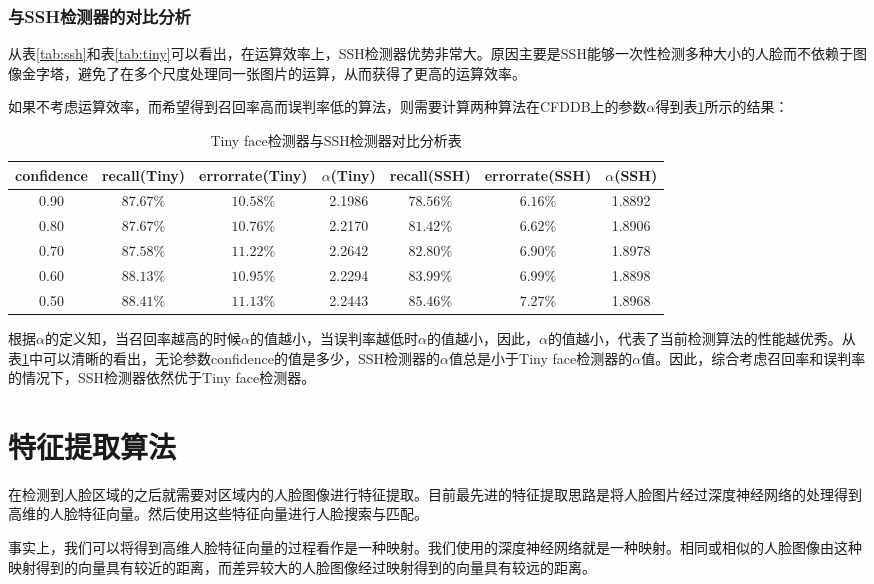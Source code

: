 \subsubsection{与SSH检测器的对比分析}

从表\ref{tab:ssh}和表\ref{tab:tiny}可以看出，在运算效率上，SSH检测器优势非常大。原因主要是SSH能够一次性检测多种大小的人脸而不依赖于图像金字塔，避免了在多个尺度处理同一张图片的运算，从而获得了更高的运算效率。

如果不考虑运算效率，而希望得到召回率高而误判率低的算法，则需要计算两种算法在CFDDB上的参数$\alpha$得到表\ref{tab:tinyandssh}所示的结果：

\begin{table}[!hpb]
	\centering
	\caption{Tiny face检测器与SSH检测器对比分析表}
	\label{tab:tinyandssh}
	\begin{tabular}{ c|ccc|ccc }
		\hline
		confidence & recall(Tiny) & errorrate(Tiny) &$\alpha$(Tiny) & recall(SSH)& errorrate(SSH)& $\alpha$(SSH)\\
		\hline
		0.90  & $87.67\%$& $10.58\%$& 2.1986 & $78.56\%$& $6.16\%$& 1.8892\\
		0.80  & $87.67\%$& $10.76\%$& 2.2170 & $81.42\%$& $6.62\%$& 1.8906\\
		0.70  & $87.58\%$& $11.22\%$& 2.2642 & $82.80\%$& $6.90\%$& 1.8978\\
		0.60  & $88.13\%$& $10.95\%$& 2.2294 & $83.99\%$& $6.99\%$& 1.8898\\
		0.50  & $88.41\%$& $11.13\%$& 2.2443 & $85.46\%$& $7.27\%$& 1.8968\\
		\hline
	\end{tabular}
\end{table}

根据$\alpha$的定义知，当召回率越高的时候$\alpha$的值越小，当误判率越低时$\alpha$的值越小，因此，$\alpha$的值越小，代表了当前检测算法的性能越优秀。从表\ref{tab:tinyandssh}中可以清晰的看出，无论参数confidence的值是多少，SSH检测器的$\alpha$值总是小于Tiny face检测器的$\alpha$值。因此，综合考虑召回率和误判率的情况下，SSH检测器依然优于Tiny face检测器。

\section{特征提取算法}

在检测到人脸区域的之后就需要对区域内的人脸图像进行特征提取。目前最先进的特征提取思路是将人脸图片经过深度神经网络的处理得到高维的人脸特征向量。然后使用这些特征向量进行人脸搜索与匹配。

事实上，我们可以将得到高维人脸特征向量的过程看作是一种映射。我们使用的深度神经网络就是一种映射。相同或相似的人脸图像由这种映射得到的向量具有较近的距离，而差异较大的人脸图像经过映射得到的向量具有较远的距离。

